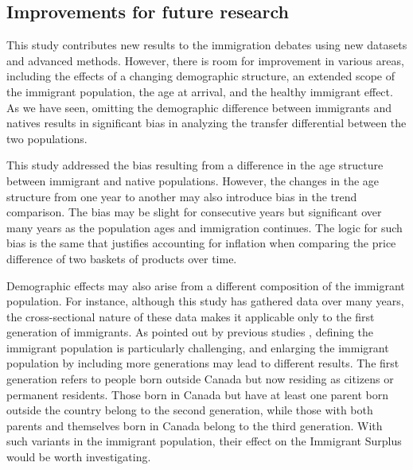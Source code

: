 

\subsection{Improvements for future research}
This study contributes new results to the immigration debates using new datasets and advanced methods.
However, there is room for improvement in various areas, including the effects of a changing demographic structure, an extended scope of the immigrant population, the age at arrival, and the healthy immigrant effect.
As we have seen, omitting the demographic difference between immigrants and natives results in significant bias in analyzing the transfer differential between the two populations.

\vspace{0.7em}\par
This study addressed the bias resulting from a difference in the age structure between immigrant and native populations. However, the changes in the age structure from one year to another may also introduce bias in the trend comparison. The bias may be slight for consecutive years but significant over many years as the population ages and immigration continues.
The logic for such bias is the same that justifies accounting for inflation when comparing the price difference of two baskets of products over time.

\vspace{0.7em}\par
Demographic effects may also arise from a different composition of the immigrant population.
For instance, although this study has gathered data over many years, the cross-sectional nature of these data makes it applicable only to the first generation of immigrants.
As pointed out by previous studies \citep{Lee:1998fs}, defining the immigrant population is particularly challenging, and enlarging the immigrant population by including more generations may lead to different results.
The first generation refers to people born outside Canada but now residing as citizens or permanent residents.
Those born in Canada but have at least one parent born outside the country belong to the second generation, while those with both parents and themselves born in Canada belong to the third generation.
With such variants in the immigrant population, their effect on the Immigrant Surplus would be worth investigating.

